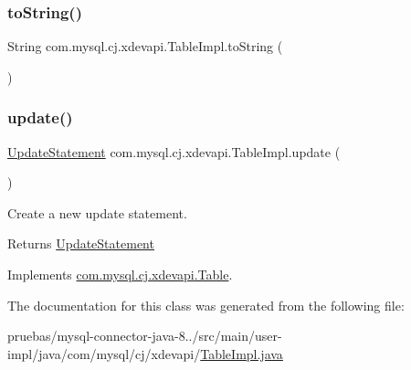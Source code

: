 \mbox{\label{classcom_1_1mysql_1_1cj_1_1xdevapi_1_1_table_impl_aa7bfb3a165db21c34060c5cbb6b111b2}} 
\subsubsection{\texorpdfstring{to\+String()}{toString()}}
{\footnotesize\ttfamily String com.\+mysql.\+cj.\+xdevapi.\+Table\+Impl.\+to\+String (\begin{DoxyParamCaption}{ }\end{DoxyParamCaption})}

\mbox{\label{classcom_1_1mysql_1_1cj_1_1xdevapi_1_1_table_impl_a4f6da4761f5ff7becb0737c11b0ea0db}} 
\subsubsection{\texorpdfstring{update()}{update()}}
{\footnotesize\ttfamily \mbox{\hyperlink{interfacecom_1_1mysql_1_1cj_1_1xdevapi_1_1_update_statement}{Update\+Statement}} com.\+mysql.\+cj.\+xdevapi.\+Table\+Impl.\+update (\begin{DoxyParamCaption}{ }\end{DoxyParamCaption})}

Create a new update statement.

\begin{DoxyReturn}{Returns}
\mbox{\hyperlink{interfacecom_1_1mysql_1_1cj_1_1xdevapi_1_1_update_statement}{Update\+Statement}} 
\end{DoxyReturn}


Implements \mbox{\hyperlink{interfacecom_1_1mysql_1_1cj_1_1xdevapi_1_1_table_a941215cefeb7236388db7d0390621a17}{com.\+mysql.\+cj.\+xdevapi.\+Table}}.



The documentation for this class was generated from the following file\+:\begin{DoxyCompactItemize}
\item 
pruebas/mysql-\/connector-\/java-\/8../src/main/user-\/impl/java/com/mysql/cj/xdevapi/\mbox{\hyperlink{_table_impl_8java}{Table\+Impl.\+java}}\end{DoxyCompactItemize}
